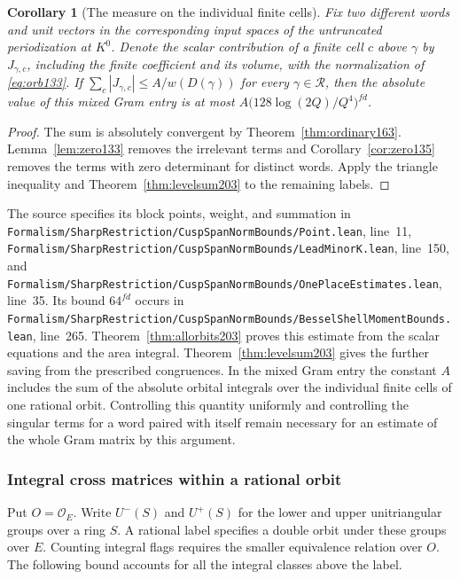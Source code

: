 \documentclass[a4paper,11pt]{article}
\newtheorem{corollary}[proposition]{Corollary}
\theoremstyle{definition}
\theoremstyle{remark}
\newcommand{\srcloc}[2]{{\small\nolinkurl{#1.lean}}, line~#2}
\numberwithin{equation}{section}
\begin{document}
\begin{corollary}[The measure on the individual finite cells]
\label{cor:amplitude203}
Fix two different words and unit vectors in the corresponding input
spaces of the untruncated periodization at \(K^0\). Denote the
scalar contribution of a finite cell \(c\) above \(\gamma\) by
\(J_{\gamma,c}\), including the finite coefficient and its volume,
with the normalization of \eqref{eq:orb133}. If
\(\sum_c |J_{\gamma,c}|\le A/w(D(\gamma))\) for every
\(\gamma\in\mathcal R\), then the absolute value of this mixed
Gram entry is at most
\(A\bigl(128\log(2Q)/Q^4\bigr)^{fd}\).
\end{corollary}

\begin{proof}
The sum is absolutely convergent by Theorem~\ref{thm:ordinary163}.
Lemma~\ref{lem:zero133} removes the irrelevant terms and
Corollary~\ref{cor:zero135} removes the terms with zero determinant
for distinct words. Apply the triangle inequality and
Theorem~\ref{thm:levelsum203} to the remaining labels.
\end{proof}

The source specifies its block points, weight, and summation
in \srcloc{Formalism/SharpRestriction/CuspSpanNormBounds/Point}{11},
\srcloc{Formalism/SharpRestriction/CuspSpanNormBounds/LeadMinorK}{150},
and \srcloc{Formalism/SharpRestriction/CuspSpanNormBounds/OnePlaceEstimates}{35}.
Its bound \(64^{fd}\) occurs in
\srcloc{Formalism/SharpRestriction/CuspSpanNormBounds/BesselShellMomentBounds}{265}.
Theorem~\ref{thm:allorbits203} proves this estimate from the scalar
equations and the area integral. Theorem~\ref{thm:levelsum203} gives
the further saving from the prescribed congruences. In the mixed
Gram entry the constant \(A\) includes the sum of the absolute
orbital integrals over the individual finite cells of one rational
orbit. Controlling this quantity uniformly and controlling the
singular terms for a word paired with itself remain necessary for
an estimate of the whole Gram matrix by this argument.

\subsubsection{Integral cross matrices within a rational orbit}\label{nav:VIII-15}
\label{sub:crossclasses230}

Put \(O=\mathcal O_E\). Write \(U^-(S)\) and \(U^+(S)\)
for the lower and upper unitriangular groups over a ring
\(S\). A rational label specifies a double orbit under these
groups over \(E\). Counting integral flags requires the
smaller equivalence relation over \(O\). The following bound
accounts for all the integral classes above the label.
\end{document}
